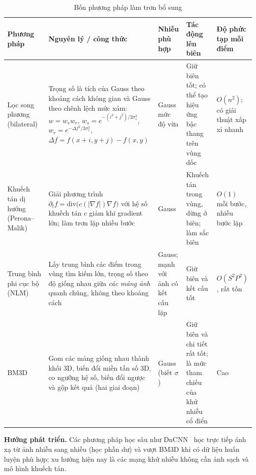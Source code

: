 \begin{table}[!htbp]
\centering
\scriptsize
\caption{Bốn phương pháp làm trơn bổ sung}
\label{tab:w6_smooth_extra}
\renewcommand{\arraystretch}{1.3}
\begin{tabularx}{\textwidth}{|p{1.7cm}|X|p{2.1cm}|X|p{1.6cm}|}
\hline
\textbf{Phương pháp} & \textbf{Nguyên lý / công thức} & \textbf{Nhiễu phù hợp} & \textbf{Tác động lên biên} & \textbf{Độ phức tạp mỗi điểm} \\
\hline
Lọc song phương (bilateral)~\citep{tomasi1998bilateral} & Trọng số là tích của Gauss theo khoảng cách không gian và Gauss theo chênh lệch mức xám: $w = w_s w_r$, \newline $w_s = e^{-(i^2 + j^2)/2\sigma_s^2}$, \newline $w_r = e^{-\Delta f^2/2\sigma_r^2}$, \newline $\Delta f = f(x + i, y + j) - f(x, y)$ & Gauss mức độ vừa & Giữ biên tốt; có thể tạo hiệu ứng bậc thang trên vùng dốc & $O(n^2)$; có giải thuật xấp xỉ nhanh \\
\hline
Khuếch tán dị hướng (Perona--Malik)~\citep{perona1990scale} & Giải phương trình $\partial_t f = \mathrm{div}\big(c(|\nabla f|)\nabla f\big)$ với hệ số khuếch tán $c$ giảm khi gradient lớn; làm trơn lặp nhiều bước & Gauss & Khuếch tán trong vùng, dừng ở biên; làm sắc biên & $O(1)$ mỗi bước, nhiều bước lặp \\
\hline
Trung bình phi cục bộ (NLM)~\citep{buades2005non} & Lấy trung bình các điểm trong vùng tìm kiếm lớn, trọng số theo độ giống nhau giữa \emph{các mảng ảnh} quanh chúng, không theo khoảng cách & Gauss; mạnh với ảnh có kết cấu lặp & Giữ biên và kết cấu tốt & $O(S^2 P^2)$, rất tốn \\
\hline
BM3D~\citep{dabov2007image} & Gom các mảng giống nhau thành khối 3D, biến đổi miền tần số 3D, co ngưỡng hệ số, biến đổi ngược và gộp kết quả (hai giai đoạn) & Gauss (biết $\sigma$) & Giữ biên và chi tiết rất tốt; là mức tham chiếu của khử nhiễu cổ điển & Cao \\
\hline
\end{tabularx}
\end{table}

\textbf{Hướng phát triển.} Các phương pháp học sâu như DnCNN~\citep{zhang2017beyond} học trực tiếp ánh xạ từ ảnh nhiễu sang nhiễu (học phần dư) và vượt BM3D khi có dữ liệu huấn luyện phù hợp; xu hướng hiện nay là các mạng khử nhiễu không cần ảnh sạch và mô hình khuếch tán.

